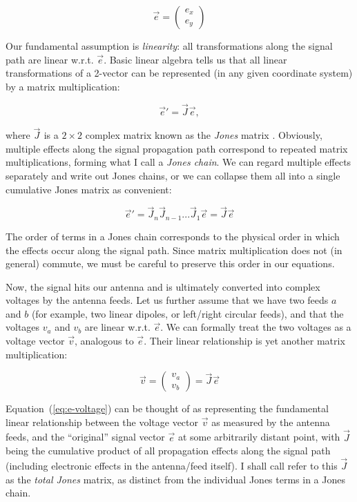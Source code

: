 \documentclass[referee]{aa}
\newcommand{\jones}[2]{\vec {#1}_{#2}}
\begin{document}
\[
\vec e = \left( \begin{array}{c}e_x\\e_y\end{array} \right) 
\]

Our fundamental assumption is {\em linearity}: all transformations along the signal path are linear w.r.t. $\vec e$. Basic linear algebra tells us that all linear transformations of a 2-vector can be represented (in any given coordinate system) by a matrix multiplication:

\[
\vec e' = \jones{J}{} \vec e,
\]

where $\jones{J}{}$ is a $2\times2$ complex matrix known as the {\em Jones} matrix \citep{jones}. Obviously, multiple effects along the signal propagation path correspond to repeated matrix multiplications, forming what I call a {\em Jones chain}. We can regard multiple effects separately and write out Jones chains, or we can collapse them all into a single cumulative Jones matrix as convenient:

\begin{equation}\label{eq:jones-chain}
\vec e' = \jones{J}{n} \jones{J}{n-1} ... \jones{J}{1} \vec e = \jones{J}{} \vec e
\end{equation}

The order of terms in a Jones chain corresponds to the physical order in which the effects occur along the signal path. Since matrix multiplication does not (in general) commute, we must be careful to preserve this order in our equations.

Now, the signal hits our antenna and is ultimately converted into complex voltages by the antenna feeds. Let us further assume that we have two feeds $a$ and $b$ (for example, two linear dipoles, or left/right circular feeds), and that the voltages $v_a$ and $v_b$ are linear w.r.t. $\vec e$. We can formally treat the two voltages as a voltage vector $\vec v$, analogous to $\vec e$. Their linear relationship is yet another matrix multiplication:

\begin{equation}\label{eq:e-voltage}
\vec v = \left( \begin{array}{c}v_a\\v_b\end{array} \right) = \jones{J}{} \vec e
\end{equation}
 
Equation~(\ref{eq:e-voltage}) can be thought of as representing the fundamental linear relationship between the voltage vector $\vec v$ as measured by the antenna feeds, and the ``original'' signal vector $\vec e$ at some arbitrarily distant point, with $\jones{J}{}$ being the cumulative product of all propagation effects along the signal path (including electronic effects in the antenna/feed itself). I shall call refer to this $\jones{J}{}$ as the {\em total Jones} matrix, as distinct from the individual Jones terms in a Jones chain.
\end{document}
